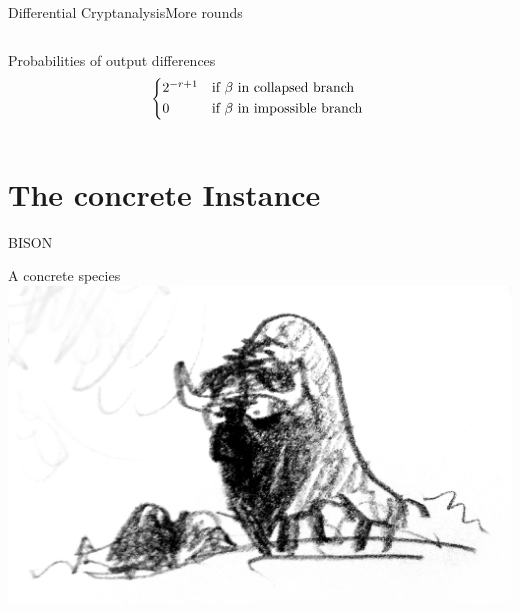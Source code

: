 \begin{frame}{Differential Cryptanalysis}{More rounds}
\begin{columns}
\begin{column}{0.49\textwidth}
{\begin{block}{Probabilities of output differences}
\begin{equation*}
\begin{cases*}
                        2^{-r+1} & if $\beta$ in collapsed branch\\
                        0        & if $\beta$ in impossible branch
                    \end{cases*}
                \end{equation*}
            \end{block}
            }
        \end{column}
    \end{columns}
\end{frame}

\section{The concrete Instance}
\begin{frame}{BISON}
    \centering
    \begin{minipage}{0.63\textwidth}
    \centering
    \begin{block}{A concrete species}
        \centering
        \vspace{2pt}
        \includegraphics[height=0.7\textheight]{data/bison-logo}
    \end{block}
    \end{minipage}
\end{frame}

